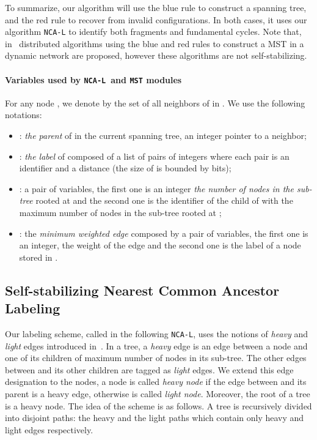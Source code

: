 \documentclass[11pt,a4paper]{article}
\newcommand{\MST}{\mbox{\tt MST}}
\newcommand{\LabA}{\mbox{\tt NCA-L}}
\begin{document}
To summarize, our algorithm will use the blue rule to construct a spanning tree, and the red rule to recover from invalid configurations. In both cases, it 
uses our algorithm \LabA\/ 
to identify both fragments and fundamental cycles. Note that, in~\cite{ParkMHT90,PMHT92} distributed algorithms using the blue and red rules to construct a MST in a dynamic network are proposed, however these algorithms are not self-stabilizing.


\paragraph{Variables used by \LabA\ and \MST\/ modules}
For any node , we denote by  the set of all neighbors of  in . 
We use the following notations: 
\begin{itemize}
\item : \textit{the parent} of  in the current spanning tree, an integer pointer to a neighbor;\item : \textit{the label} of  composed of a list of pairs of integers where each pair is an identifier and a distance (the size of  is bounded by  bits);\item : a pair of variables, the first one is an integer \textit{the number of nodes in the sub-tree} rooted at  and the second one is the identifier of the child  of  with the maximum number of nodes in the sub-tree rooted at ;\item : the \textit{minimum weighted edge} composed by a pair of variables, the first one is an integer, the weight of the edge and the second one is the label of a node  stored in .
\end{itemize}


\subsection{Self-stabilizing Nearest Common Ancestor Labeling}
\label{sec:label}
Our labeling scheme, called in the following \LabA, uses the 
notions of \textit{heavy} and \textit{light} edges 
introduced in~\cite{HT84j}. 
In a tree, a \textit{heavy} edge is an edge between a node  and one of its children  of maximum number of nodes 
in its sub-tree. The other edges between  and its other children are tagged as \textit{light} edges. We extend this edge designation to the nodes, a node  is called \emph{heavy node} if the edge between  and its parent is a heavy edge, otherwise  is called \emph{light node}. Moreover, the root of a tree is a heavy node.
The idea of the scheme is as follows. A tree is recursively 
divided into disjoint paths: the heavy and the light paths which contain only heavy and light edges respectively.
\end{document}
